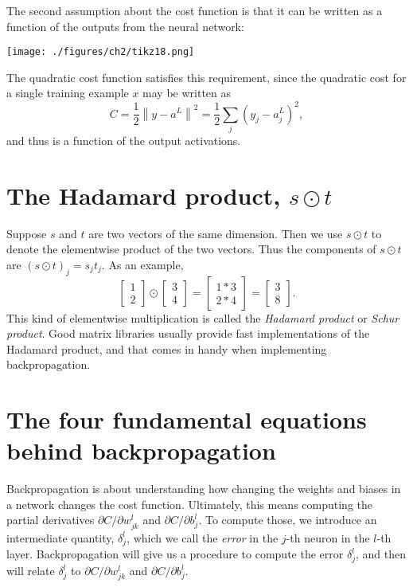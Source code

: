 \documentclass[a4paper,twoside,10pt]{book}
\begin{document}
The second assumption about the cost function is that it can be written as a function of the outputs from the neural network:

\begin{center}
\texttt{[image: ./figures/ch2/tikz18.png]}
\end{center}
The quadratic cost function satisfies this requirement, since the quadratic cost for a single training example $x$ may be written as
\begin{equation}
C = \frac{1}{2} \left\|y-a^L\right\|^2 = \frac{1}{2} \sum_j \left(y_j-a^L_j\right)^2,
\tag{27}\label{eq:27}
\end{equation}
and thus is a function of the output activations.

\section{The Hadamard product, $s\odot{}t$}
Suppose $s$ and $t$ are two vectors of the same dimension. Then we use $s\odot{}t$ to denote the elementwise product of the two vectors. Thus the components of $s\odot{}t$ are $(s \odot t)_j = s_j t_j$. As an example,
\begin{equation}
	\left[\begin{array}{c} 1 \\ 2 \end{array}\right] 
	\odot \left[\begin{array}{c} 3 \\ 4\end{array} \right]
	= \left[ \begin{array}{c} 1 * 3 \\ 2 * 4 \end{array} \right]
	= \left[ \begin{array}{c} 3 \\ 8 \end{array} \right].
	\tag{28}\label{eq:28}
\end{equation}
This kind of elementwise multiplication is called the \textit{Hadamard product} or \textit{Schur product}. Good matrix libraries usually provide fast implementations of the Hadamard product, and that comes in handy when implementing backpropagation.

\section{The four fundamental equations behind backpropagation}
\label{sec:2.4}
Backpropagation is about understanding how changing the weights and biases in a network changes the cost function. Ultimately, this means computing the partial derivatives $\partial{}C/\partial{}w^l_{jk}$ and $\partial{}C/\partial{}b^l_j$. To compute those, we introduce an intermediate quantity, $\delta^l_j$, which we call the \textit{error} in the $j$-th neuron in the $l$-th layer. Backpropagation will give us a procedure to compute the error $\delta^l_j$, and then will relate $\delta^l_j$ to $\partial{}C/\partial{}w^l_{jk}$ and $\partial{}C/\partial{}b^l_j$.
\end{document}
